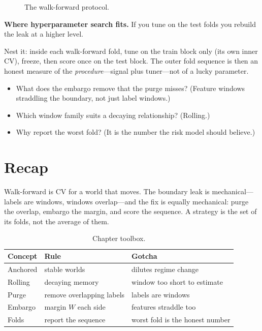 \begin{figure}[htbp]\centering

\caption{The walk-forward protocol.}
\label{fig:wfproto}
\end{figure}

\begin{example}\label{ex:nested}
\textbf{Where hyperparameter search fits.} If you tune on the test folds you rebuild
the leak at a higher level.
\begin{solution}
Nest it: inside each walk-forward fold, tune on the train block only (its own inner CV),
freeze, then score once on the test block. The outer fold sequence is then an honest
measure of the \emph{procedure}---signal plus tuner---not of a lucky parameter.
\end{solution}
\end{example}

\begin{checkpoint}
\begin{itemize}
\item What does the embargo remove that the purge misses? (Feature windows straddling the
boundary, not just label windows.)
\item Which window family suits a decaying relationship? (Rolling.)
\item Why report the worst fold? (It is the number the risk model should believe.)
\end{itemize}
\end{checkpoint}

\section{Recap}\label{sec:wfrecap}

Walk-forward is CV for a world that moves. The boundary leak is mechanical---labels are
windows, windows overlap---and the fix is equally mechanical: purge the overlap, embargo
the margin, and score the sequence. A strategy is the set of its folds, not the average
of them.

\begin{table}[htbp]\centering\small
\caption{Chapter toolbox.}
\begin{tabular}{@{}lll@{}}
\toprule
Concept & Rule & Gotcha\\
\midrule
Anchored & stable worlds & dilutes regime change\\
Rolling & decaying memory & window too short to estimate\\
Purge & remove overlapping labels & labels are windows\\
Embargo & margin $W$ each side & features straddle too\\
Folds & report the sequence & worst fold is the honest number\\
\bottomrule
\end{tabular}
\end{table}

